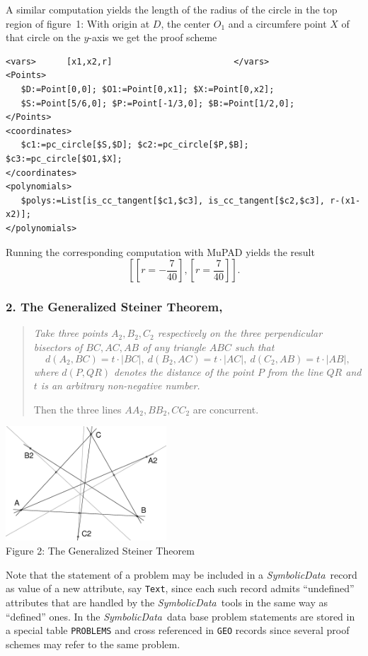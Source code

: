 \documentclass[11pt]{article}
\newcommand{\SD}{\textit{Symbolic\-Data}}
\begin{document}
A similar computation yields the length of the radius of the circle in the top
region of figure~1: With origin at $D$, the center $O_1$ and a circumfere
point $X$ of that circle on the $y$-axis we get the proof scheme
\begin{verbatim}
<vars>      [x1,x2,r]                        </vars>
<Points>
   $D:=Point[0,0]; $O1:=Point[0,x1]; $X:=Point[0,x2]; 
   $S:=Point[5/6,0]; $P:=Point[-1/3,0]; $B:=Point[1/2,0];
</Points>
<coordinates> 
   $c1:=pc_circle[$S,$D]; $c2:=pc_circle[$P,$B]; $c3:=pc_circle[$O1,$X];
</coordinates>
<polynomials>
   $polys:=List[is_cc_tangent[$c1,$c3], is_cc_tangent[$c2,$c3], r-(x1-x2)];
</polynomials>
\end{verbatim}%
Running the corresponding computation with MuPAD yields the result
\[\left[\left[r = -\frac{7}{40}\right], \left[r =
    \frac{7}{40}\right]\right]. \] 

\subsubsection*{2. The Generalized Steiner Theorem,
  \cite[Ex.~7]{Wang_97a}} 

\begin{quote}\it Take three points $A_2, B_2, C_2$ respectively on the three
  perpendicular bisectors of $BC, AC, AB$ of any triangle $ABC$ such that
$$d(A_2,BC)=t\cdot |BC|,\ d(B_2,AC)=t\cdot |AC|,\ d(C_2,AB)=t\cdot |AB|,$$
where $d(P,QR)$ denotes the distance of the point $P$ from the line $QR$ and
$t$ is an arbitrary non-negative number.
  
Then the three lines $AA_2, BB_2, CC_2$ are concurrent.
\end{quote}
\parbox[b]{8cm}{\centering\includegraphics[width=6cm]{linz-02/GSteiner.eps}\\
Figure 2: The Generalized Steiner Theorem\vskip10pt}\hfill 
\parbox[b]{7cm}{
Note that the statement of a problem may be included in a \SD\ record as value
of a new attribute, say {\tt Text}, since each such record admits
``undefined'' attributes that are handled by the \SD\ tools in the same way as
``defined'' ones.  In the \SD\ data base problem statements are stored in a
special table {\tt PROBLEMS} and cross referenced in {\tt GEO} records since
several proof schemes may refer to the same problem. \medskip}
\end{document}
